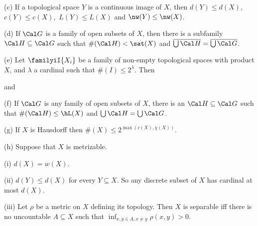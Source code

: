 (c) If a topological space $Y$ is a continuous
image of $X$, then $d(Y)\le d(X)$,
$c(Y)\le c(X),$
$L(Y)\le L(X)$
and $\nw(Y)\le\nw(X)$.

(d) If $\Cal G$ is a family of open subsets
of $X$, then there is a subfamily $\Cal H\subseteq\Cal G$ such that
$\#(\Cal H)<\sat(X)$ and
$\overline{\bigcup\Cal H}=\overline{\bigcup\Cal G}$.

(e) Let $\familyiI{X_i}$ be a family of non-empty topological spaces
with product $X$, and $\lambda$ a cardinal such that
$\#(I)\le 2^{\lambda}$.   Then




\noindent and


(f) If $\Cal G$ is any family of open subsets of $X$, there is an
$\Cal H\subseteq\Cal G$ such that $\#(\Cal H)\le\hL(X)$ and
$\bigcup\Cal H=\bigcup\Cal G$.

(g) If $X$ is Hausdorff then $\#(X)\le 2^{\max(c(X),\chi(X))}$.

(h) Suppose that $X$ is metrizable.

\quad(i) $d(X)=w(X)$.

\quad(ii) $d(Y)\le d(X)$ for every $Y\subseteq X$.
So any discrete subset of $X$ has cardinal at most $d(X)$.


\quad(iii) Let $\rho$ be a metric on $X$ defining its topology.   Then $X$
is separable iff there is no uncountable $A\subseteq X$ such that
$\inf_{x,y\in A,x\ne y}\rho(x,y)>0$.

